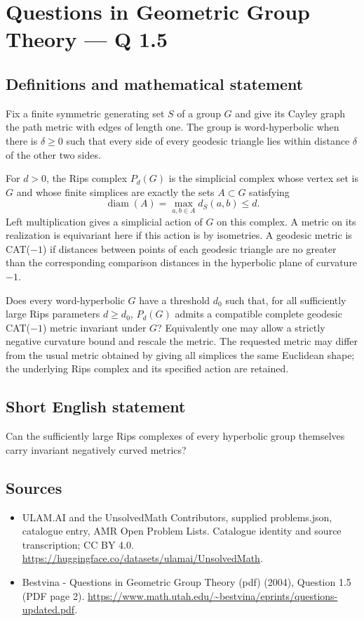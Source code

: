 \documentclass[11pt,a4paper]{article}
\begin{document}
\section*{Questions in Geometric Group Theory — Q 1.5}\label{statement}

\subsection{Definitions and mathematical statement}
Fix a finite symmetric generating set $S$ of a group $G$ and give its Cayley graph the path metric with edges of length one. The group is word-hyperbolic when there is $\delta\geq0$ such that every side of every geodesic triangle lies within distance $\delta$ of the other two sides.

For $d>0$, the Rips complex $P_d(G)$ is the simplicial complex whose vertex set is $G$ and whose finite simplices are exactly the sets $A\subset G$ satisfying
\[
 \operatorname{diam}(A)=\max_{a,b\in A}d_S(a,b)\leq d.
\]
Left multiplication gives a simplicial action of $G$ on this complex. A metric on its realization is equivariant here if this action is by isometries. A geodesic metric is CAT($-1$) if distances between points of each geodesic triangle are no greater than the corresponding comparison distances in the hyperbolic plane of curvature $-1$.

Does every word-hyperbolic $G$ have a threshold $d_0$ such that, for all sufficiently large Rips parameters $d\geq d_0$, $P_d(G)$ admits a compatible complete geodesic CAT($-1$) metric invariant under $G$? Equivalently one may allow a strictly negative curvature bound and rescale the metric. The requested metric may differ from the usual metric obtained by giving all simplices the same Euclidean shape; the underlying Rips complex and its specified action are retained.
\subsection{Short English statement}
Can the sufficiently large Rips complexes of every hyperbolic group themselves carry invariant negatively curved metrics?
\subsection{Sources}
\begin{itemize}
\item[S1] ULAM.AI and the UnsolvedMath Contributors, supplied problems.json, catalogue entry, AMR Open Problem Lists. Catalogue identity and source transcription; CC BY 4.0.
\url{https://huggingface.co/datasets/ulamai/UnsolvedMath}.
\item[S2] Bestvina - Questions in Geometric Group Theory (pdf) (2004), Question 1.5 (PDF page 2). 
\url{https://www.math.utah.edu/~bestvina/eprints/questions-updated.pdf}.
\end{itemize}
\end{document}

